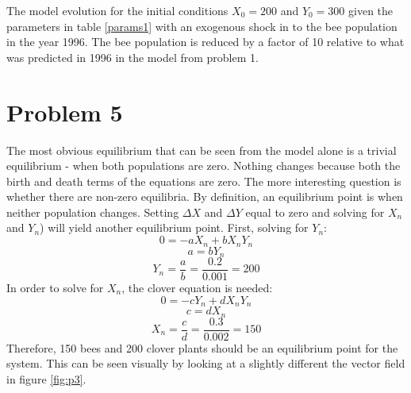 \documentclass[12pt,a4paper,titlepage]{report}
\begin{document}
		\begin{table} 
			\centering
			
			\caption{The model evolution for the initial conditions \(X_{0} = 200\) and \(Y_{0} = 300\) given the parameters in table \ref{params1} with an exogenous shock in to the bee population in the year 1996. The bee population is reduced by a factor of 10 relative to what was predicted in 1996 in the model from problem 1.}
			\label{tab:p4}
		\end{table}
	
	\section*{Problem 5}
		The most obvious equilibrium that can be seen from the model alone is a trivial equilibrium - when both populations are zero. Nothing changes because both the birth and death terms of the equations are zero. The more interesting question is whether there are non-zero equilibria. By definition, an equilibrium point is when neither population changes. Setting \(\Delta X\) and \(\Delta Y\) equal to zero and solving for \(X_n\) and \(Y_n\)) will yield another equilibrium point. First, solving for \(Y_n\):  
		\[0 = -aX_{n} + b X_{n}Y_{n}\]
		\[a  = b Y_{n}\]
		\[Y_{n} = \frac{a}{b} = \frac{0.2}{0.001} = 200\]
		In order to solve for \(X_n\), the clover equation is needed:
		\[0 = -cY_{n} + d X_{n}Y_{n}\]
		\[c  = d X_{n}\]
		\[X_{n} = \frac{c}{d} = \frac{0.3}{0.002} = 150\]
		Therefore, 150 bees and 200 clover plants should be an equilibrium point for the system. This can be seen visually by looking at a slightly different the vector field in figure \ref{fig:p3}. 
\end{document}
